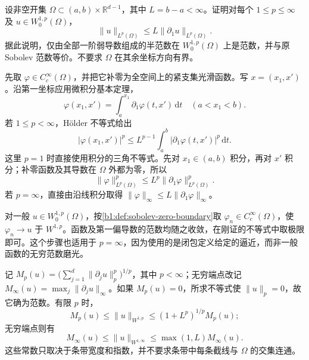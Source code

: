 \begin{exercise}\label{b1:ex:22-strip-poincare}
设非空开集 \(\Omega\subset(a,b)\times\mathbb R^{d-1}\)，其中 \(L=b-a<\infty\)。证明对每个 \(1\le p\le\infty\) 及 \(u\in W_0^{1,p}(\Omega)\)，
\[
 \|u\|_{L^p(\Omega)}\le L\|\partial_1u\|_{L^p(\Omega)}.
\]
据此说明，仅由全部一阶弱导数组成的半范数在 \(W_0^{1,p}(\Omega)\) 上是范数，并与原 Sobolev 范数等价。不要求 \(\Omega\) 在其余坐标方向有界。
\end{exercise}
\begin{solution}
先取 \(\varphi\in C_c^\infty(\Omega)\)，并把它补零为全空间上的紧支集光滑函数。写 \(x=(x_1,x')\)。沿第一坐标应用微积分基本定理，
\[
 \varphi(x_1,x')=\int_a^{x_1}\partial_1\varphi(t,x')\,\mathrm dt
 \quad(a<x_1<b).
\]
若 \(1\le p<\infty\)，Hölder 不等式给出
\[
 |\varphi(x_1,x')|^p
 \le L^{p-1}\int_a^b|\partial_1\varphi(t,x')|^p\,\mathrm dt.
\]
这里 \(p=1\) 时直接使用积分的三角不等式。先对 \(x_1\in(a,b)\) 积分，再对 \(x'\) 积分；补零函数及其导数在 \(\Omega\) 外都为零，所以
\[
 \|\varphi\|_{L^p(\Omega)}^p
 \le L^p\|\partial_1\varphi\|_{L^p(\Omega)}^p.
\]
若 \(p=\infty\)，直接由沿线积分取得
\(\|\varphi\|_\infty\le L\|\partial_1\varphi\|_\infty\)。

对一般 \(u\in W_0^{1,p}(\Omega)\)，按\cref{b1:def:sobolev-zero-boundary}取 \(\varphi_n\in C_c^\infty(\Omega)\)，使 \(\varphi_n\to u\) 于 \(W^{1,p}\)。函数及第一偏导数的范数均随之收敛，在刚证的不等式中取极限即可。这个步骤也适用于 \(p=\infty\)，因为使用的是闭包定义给定的逼近，而非一般函数的无穷范数磨光。

记 \(M_p(u)=\bigl(\sum_{j=1}^d\|\partial_ju\|_p^p\bigr)^{1/p}\)，其中 \(p<\infty\)；无穷端点改记 \(M_\infty(u)=\max_j\|\partial_ju\|_\infty\)。如果 \(M_p(u)=0\)，所求不等式使 \(\|u\|_p=0\)，故它确为范数。有限 \(p\) 时，
\[
 M_p(u)\le\|u\|_{W^{1,p}}
 \le(1+L^p)^{1/p}M_p(u);
\]
无穷端点则有
\[
 M_\infty(u)\le\|u\|_{W^{1,\infty}}
 \le\max(1,L)M_\infty(u).
\]
这些常数只取决于条带宽度和指数，并不要求条带中每条截线与 \(\Omega\) 的交集连通。
\end{solution}

